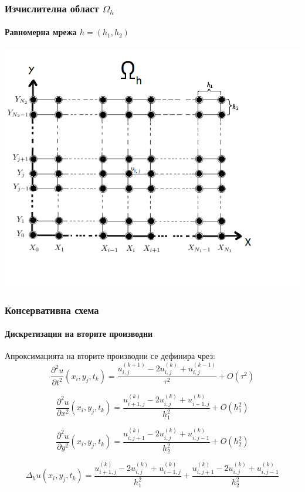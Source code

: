 \documentclass{beamer}
\begin{document}

\begin{frame}
\frametitle{Изчислителна област $\Omega_h$}
\framesubtitle{Равномерна мрежа $h=(h_1, h_2)$}
\begin{center}\vspace{0.4cm}
	\begin{minipage}[b]{0.6\linewidth}
		\includegraphics[width=\linewidth]{Omega_dah.png}
	\end{minipage}
\end{center}

\end{frame}


\begin{frame}
\frametitle{Консервативна схема}
\framesubtitle{Дискретизация на вторите производни}
Апроксимацията на вторите производни се дефинира чрез:
\begin{equation}
\frac{\partial^2 u}{\partial t^2}(x_i, y_j, t_k ) = \frac{ u^{(k+1)}_{i, j} - 2u^{(k)}_{i,j} + u^{(k-1)}_{i,j} }{\tau^2} + O(\tau^2) 
\end{equation}

\begin{equation}
\frac{\partial^2 u}{\partial x^2}(x_i, y_j, t_k ) = \frac{ u^{(k)}_{i+1, j} - 2u^{(k)}_{i,j} + u^{(k)}_{i-1,j} }{h_1^2} + O(h_1^2) 
\end{equation}

\begin{equation}
\frac{\partial^2 u}{\partial y^2}(x_i, y_j, t_k ) = \frac{ u^{(k)}_{i, j+1} - 2u^{(k)}_{i,j} + u^{(k)}_{i,j-1} }{h_2^2} + O(h_2^2) 
\end{equation}


\begin{equation}
\Delta_h u(x_i, y_j, t_k )  = \frac{ u^{(k)}_{i+1, j} - 2u^{(k)}_{i,j} + u^{(k)}_{i-1,j} }{h_1^2} + \frac{ u^{(k)}_{i, j+1} - 2u^{(k)}_{i,j} + u^{(k)}_{i,j-1} }{h_2^2}
\end{equation}

\end{frame}
\end{document}
